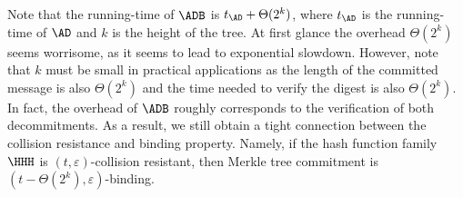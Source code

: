 \documentclass{crypto-exercise}
\begin{document}
\begin{solution}
Note that the running-time of $\ADB$ is $t_\AD + \Theta(2^k)$, where $t_\AD$ is the running-time of $\AD$ and $k$ is the height of the tree. At first glance the overhead $\Theta(2^k)$ seems worrisome, as it seems to lead to exponential slowdown. However, note that $k$ must be small in practical applications as the length of the committed message is also $\Theta(2^k)$ and the time needed to verify the digest is also $\Theta(2^k)$. In fact, the overhead of $\ADB$ roughly corresponds to the verification of both decommitments.  As a result, we still obtain a tight connection between the collision resistance and binding property. Namely, if the hash function family $\HHH$ is $(t,\varepsilon)$-collision resistant, then Merkle tree commitment is $(t-\Theta(2^k),\varepsilon)$-binding.

\end{solution}
\end{document}
